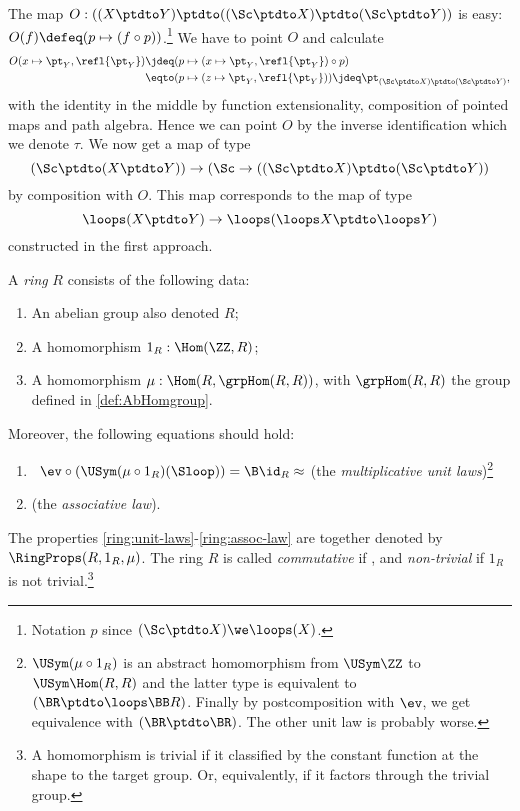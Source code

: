 \begin{remark}
The map $O: ((X\ptdto Y)\ptdto((\Sc\ptdto X)\ptdto(\Sc\ptdto Y))$
is easy: $O(f)\defeq (p\mapsto (f\circ p))$.\footnote{%
Notation $p$ since $(\Sc\ptdto X)\we\loops(X)$.}
We have to point $O$ and calculate 
\begin{align*}
O(x\mapsto\pt_Y,\refl{\pt_Y})
&\jdeq (p\mapsto(x\mapsto\pt_Y,\refl{\pt_Y})\circ p)\\
&\eqto (p\mapsto (z\mapsto\pt_Y,\refl{\pt_Y}))
 \jdeq\pt_{(\Sc\ptdto X)\ptdto(\Sc\ptdto Y)},
\end{align*}
with the identity in the middle by function extensionality,
composition of pointed maps and path algebra.
Hence we can point $O$ by the inverse identification which we denote $\tau$.
We now get a map of type 
$$(\Sc\ptdto(X\ptdto Y))\to(\Sc\to((\Sc\ptdto X)\ptdto(\Sc\ptdto Y))$$
by composition with $O$. This map corresponds to the map of type
$$\loops(X\ptdto Y) \to \loops(\loops X\ptdto \loops Y)$$
constructed in the first approach. 
\end{remark}

\begin{definition}\label{def:ring}
A \emph{ring} $R$ consists of the following data:
\begin{enumerate}
\item An abelian group also denoted $R$;
\item A homomorphism $1_R:\Hom(\ZZ,R)$;
\item A homomorphism $\mu: \Hom(R,\grpHom(R,R))$, with $\grpHom(R,R)$
the group defined in \cref{def:AbHomgroup}.
\end{enumerate}
Moreover, the following equations should hold:
    \begin{enumerate}
    \item\label{ring:unit-laws}\
    $\ev\circ(\USym(\mu\circ{1_R})(\Sloop)) = \B\id_R \approx \MB{TBD}$ 
    (the \emph{multiplicative unit laws})\footnote{%
 $\USym(\mu\circ{1_R})$ is an abstract homomorphism
from $\USym\ZZ$ to $\USym\Hom(R,R)$ and the latter type
is equivalent to $(\BR\ptdto\loops\BB R)$. Finally by postcomposition
with $\ev$, we get equivalence with $(\BR\ptdto\BR)$.
The other unit law is probably worse.}
    \item\label{ring:assoc-law}  (the \emph{associative law}). %
    \end{enumerate}
The properties \ref{ring:unit-laws}-\ref{ring:assoc-law} 
are together denoted by $\RingProps(R,1_R,\mu)$.
The ring $R$ is called \emph{commutative} if , 
and \emph{non-trivial} if $1_R$ is not trivial.\footnote{%
A homomorphism is trivial if it classified by the constant function
at the shape to the target group. Or, equivalently, if it factors
through the trivial group.}
\end{definition}

